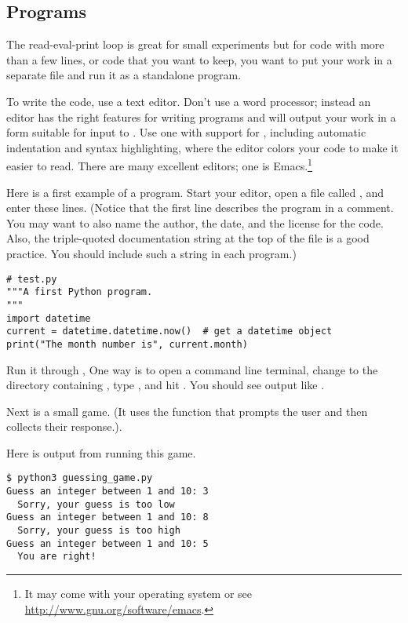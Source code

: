 \subsection{Programs}
The read-eval-print loop is great for small experiments but
for code with more than a few lines, or code that you want to
keep, you 
want to put your work in a separate file and run it as a standalone program.

To write the code, use a text editor.
Don't use a word processor; instead an editor has the right features for 
writing programs and will output your work in a form suitable for
input to \python .
Use one with support for \python{}, including
automatic indentation and  
syntax highlighting, where the editor colors your code to make it easier to
read.
There are many excellent editors; one is Emacs.\footnote{%
  It may come with your operating system or 
  see \protect\url{http://www.gnu.org/software/emacs}.}

Here is a first example of a \python{} program.
Start your editor, open a file called , and enter these lines.
(Notice that the first line describes the program in a comment.
You may want to also name the author, the date, and the license for the code.
Also, the triple-quoted documentation string at the top of the file
is a good practice.
You should include such a string in each program.)
\begin{lstlisting}[style=python]
# test.py
"""A first Python program. 
"""
import datetime
current = datetime.datetime.now()  # get a datetime object
print("The month number is", current.month)
\end{lstlisting}
Run it through \python{},
One way is to open a command line terminal,
change to the directory containing ,  
type , and hit . 
You should see
output like .

Next is a small game. 
(It uses the \python{} function  that prompts the user
and then collects their response.).

Here is output from running this game.
\begin{lstlisting}
$ python3 guessing_game.py
Guess an integer between 1 and 10: 3
  Sorry, your guess is too low
Guess an integer between 1 and 10: 8
  Sorry, your guess is too high
Guess an integer between 1 and 10: 5
  You are right!
\end{lstlisting}  %

